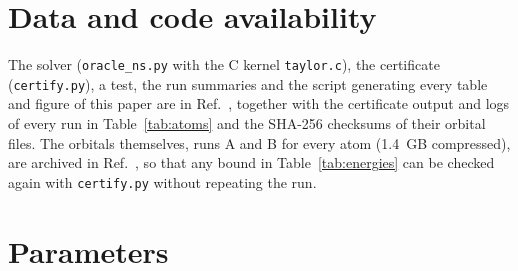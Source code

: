 \documentclass[aps,pra,reprint,superscriptaddress,amsmath,amssymb,longbibliography]{revtex4-2}
\begin{document}
\section*{Data and code availability}
The solver (\texttt{oracle\_ns.py} with the C kernel \texttt{taylor.c}), the certificate (\texttt{certify.py}), a test, the run summaries and the script generating every table and figure of this paper are in Ref.~\cite{code}, together with the certificate output and logs of every run in Table~\ref{tab:atoms} and the SHA-256 checksums of their orbital files. The orbitals themselves, runs A and B for every atom (1.4~GB compressed), are archived in Ref.~\cite{data}, so that any bound in Table~\ref{tab:energies} can be checked again with \texttt{certify.py} without repeating the run.

\appendix
\section{Parameters}\label{app:params}
\end{document}

